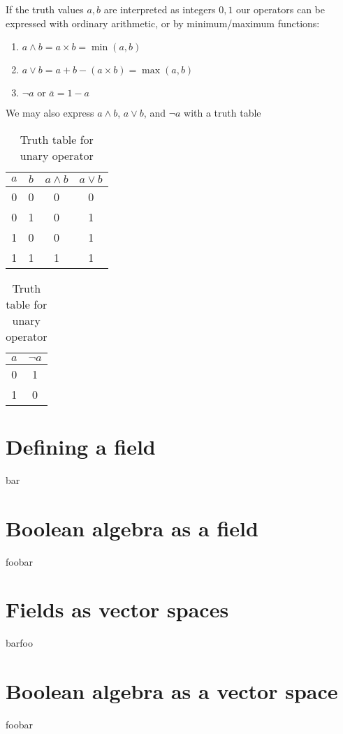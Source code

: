 \documentclass{article}
\begin{document}
If the truth values $a, b$ are interpreted as integers $0, 1$ our operators can
be expressed with ordinary arithmetic, or by minimum/maximum functions:
\begin{enumerate}
  \item $a \wedge b = a \times b = \min(a,b)$
  \item $a \vee b = a + b - (a \times b) = \max(a,b)$
  \item $\neg a\text{ or }\bar{a} = 1 - a$
\end{enumerate}
We may also express $a \wedge b$, $a \vee b$, and $\neg a$ with a truth table

\begin{table}[]
\parbox{.45\linewidth}{
\centering
\begin{tabular}{@{}c c c c @{}}
\toprule
$a$ & $b$ & $a \wedge b$ & $a \vee b$ \\ \toprule
0   & 0   & 0            & 0          \\ \midrule
0   & 1   & 0            & 1          \\ \midrule
1   & 0   & 0            & 1          \\ \midrule
1   & 1   & 1            & 1          \\ \bottomrule
\end{tabular}
\caption{Truth table for binary operators}
}
\hfill
\parbox{.45\linewidth}{
\centering
\begin{tabular}{@{} c c @{}}
\toprule
$a$ & $\neg a$ \\ \toprule
0   & 1        \\ \midrule
1   & 0        \\ \bottomrule
\end{tabular}
\caption{Truth table for unary operator }
}
\end{table}


\section{Defining a field}
\label{sec:Defining a field}

bar

\section{Boolean algebra as a field}
\label{sec:Boolean algebra as a field}

foobar

\section{Fields as vector spaces}
\label{sec:Fields as vector spaces}

barfoo

\section{Boolean algebra as a vector space}
\label{sec:Boolean algebra as a vector space}

foobar
\end{document}
